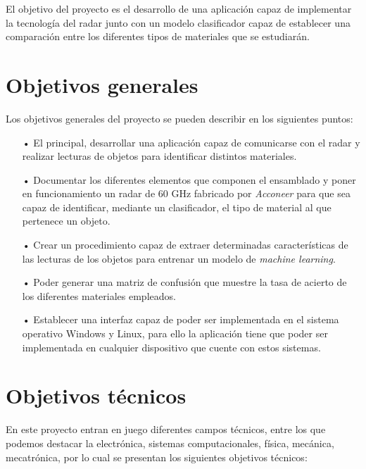 
El objetivo del proyecto es el desarrollo de una aplicación capaz de implementar la tecnología del radar junto con un modelo clasificador capaz de establecer una comparación entre los diferentes tipos de materiales que se estudiarán.

\section{Objetivos generales}

Los objetivos generales del proyecto se pueden describir en los siguientes puntos:
\begin{itemize}
\item[•] El principal, desarrollar una aplicación capaz de comunicarse con el radar y realizar lecturas de objetos para identificar distintos materiales.

\item[•] Documentar los diferentes elementos que componen el ensamblado y poner en funcionamiento un radar de 60 GHz fabricado por \textit{Acconeer} para que sea capaz de identificar, mediante un clasificador, el tipo de material al que pertenece un objeto.

\item[•] Crear un procedimiento capaz de extraer determinadas características de las lecturas de los objetos para entrenar un modelo de \textit{machine learning}.

\item[•] Poder generar una matriz de confusión que muestre la tasa de acierto de los diferentes materiales empleados.

\item[•] Establecer una interfaz capaz de poder ser implementada en el sistema operativo Windows y Linux, para ello la aplicación tiene que poder ser implementada en cualquier dispositivo que cuente con estos sistemas.
\end{itemize}

\section{Objetivos técnicos}

En este proyecto entran en juego diferentes campos técnicos, entre los que podemos destacar la electrónica, sistemas computacionales, física, mecánica, mecatrónica, por lo cual se presentan los siguientes objetivos técnicos:

